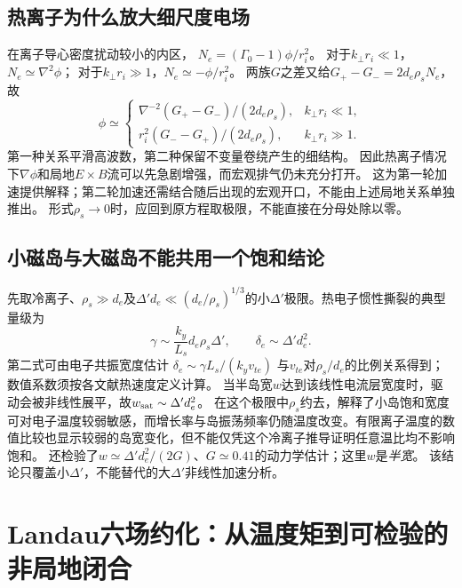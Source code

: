 \subsection{热离子为什么放大细尺度电场}
在离子导心密度扰动较小的内区，
$N_e=(\Gamma_0-1)\phi/r_i^2$。
对于$k_\perp r_i\ll1$，$N_e\simeq\nabla^2\phi$；
对于$k_\perp r_i\gg1$，$N_e\simeq-\phi/r_i^2$。
两族$G$之差又给$G_+-G_-=2d_e\rho_sN_e$，故
\begin{equation}
 \phi\simeq
 \begin{cases}
 \nabla^{-2}(G_+-G_-)/(2d_e\rho_s),&k_\perp r_i\ll1,\\
 r_i^2(G_--G_+)/(2d_e\rho_s),&k_\perp r_i\gg1.
 \end{cases}
\end{equation}
第一种关系平滑高波数，第二种保留不变量卷绕产生的细结构。
因此热离子情况下$\nabla\phi$和局地$E\times B$流可以先急剧增强，而宏观排气仍未充分打开。
这为第一轮加速提供解释；第二轮加速还需结合随后出现的宏观开口，不能由上述局地关系单独推出。
形式$\rho_s\to0$时，应回到原方程取极限，不能直接在分母处除以零。

\subsection{小磁岛与大磁岛不能共用一个饱和结论}
先取冷离子、$\rho_s\gg d_e$及$\Delta'd_e\ll(d_e/\rho_s)^{1/3}$的小$\Delta'$极限。热电子惯性撕裂的典型量级为
\begin{equation}
 \gamma\sim\frac{k_y}{L_s}d_e\rho_s\Delta',\qquad
 \delta_e\sim\Delta'd_e^2.
\end{equation}
第二式可由电子共振宽度估计
$\delta_e\sim\gamma L_s/(k_yv_{te})$
与$v_{te}$对$\rho_s/d_e$的比例关系得到；数值系数须按各文献热速度定义计算。
当半岛宽$w$达到该线性电流层宽度时，驱动会被非线性展平，故$w_{\rm sat}\sim\Delta'd_e^2$。
在这个极限中$\rho_s$约去，解释了小岛饱和宽度可对电子温度较弱敏感，而增长率与岛振荡频率仍随温度改变。有限离子温度的数值比较也显示较弱的岛宽变化，但不能仅凭这个冷离子推导证明任意温比均不影响饱和。
\citet{E475}还检验了$w\simeq\Delta'd_e^2/(2G)$、$G\simeq0.41$的动力学估计；这里$w$是\emph{半宽}。
该结论只覆盖小$\Delta'$，不能替代\citet{F672}的大$\Delta'$非线性加速分析。

\section{Landau六场约化：从温度矩到可检验的非局地闭合}

